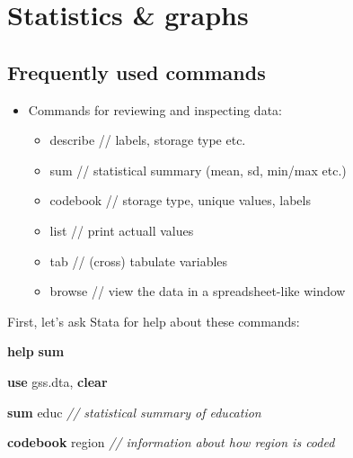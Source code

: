 \documentclass[]{book}
\newenvironment{Shaded}{\begin{snugshade}}{\end{snugshade}}
\newcommand{\CommentTok}[1]{\textcolor[rgb]{0.56,0.35,0.01}{\textit{#1}}}
\newcommand{\KeywordTok}[1]{\textcolor[rgb]{0.13,0.29,0.53}{\textbf{#1}}}
\newcommand{\NormalTok}[1]{#1}
\providecommand{\tightlist}{%
  \setlength{\itemsep}{0pt}\setlength{\parskip}{0pt}}
\begin{document}
\hypertarget{statistics-graphs}{%
\section{Statistics \& graphs}\label{statistics-graphs}}

\hypertarget{frequently-used-commands}{%
\subsection{Frequently used commands}\label{frequently-used-commands}}

\begin{itemize}
\tightlist
\item
  Commands for reviewing and inspecting data:

  \begin{itemize}
  \tightlist
  \item
    describe // labels, storage type etc.
  \item
    sum // statistical summary (mean, sd, min/max etc.)
  \item
    codebook // storage type, unique values, labels
  \item
    list // print actuall values
  \item
    tab // (cross) tabulate variables
  \item
    browse // view the data in a spreadsheet-like window
  \end{itemize}
\end{itemize}

First, let's ask Stata for help about these commands:

\begin{Shaded}
\begin{Highlighting}[]
\KeywordTok{help} \KeywordTok{sum}
\end{Highlighting}
\end{Shaded}

\begin{Shaded}
\begin{Highlighting}[]
\KeywordTok{use}\NormalTok{ gss.dta, }\KeywordTok{clear}

\KeywordTok{sum}\NormalTok{ educ }\CommentTok{// statistical summary of education}
\end{Highlighting}
\end{Shaded}

\begin{Shaded}
\begin{Highlighting}[]
\KeywordTok{codebook}\NormalTok{ region }\CommentTok{// information about how region is coded}
\end{Highlighting}
\end{Shaded}
\end{document}

